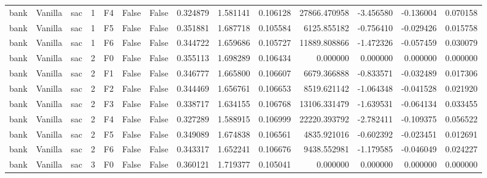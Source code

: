 \begin{tabular}{lllrlllrrrrrrr}
      bank & Vanilla &       sac &     1 &  F4 &           False &            False &  0.324879 &  1.581141 & 0.106128 &     27866.470958 &          -3.456580 &       -0.136004 &            0.070158 \\
      bank & Vanilla &       sac &     1 &  F5 &           False &            False &  0.351881 &  1.687718 & 0.105584 &      6125.855182 &          -0.756410 &       -0.029426 &            0.015758 \\
      bank & Vanilla &       sac &     1 &  F6 &           False &            False &  0.344722 &  1.659686 & 0.105727 &     11889.808866 &          -1.472326 &       -0.057459 &            0.030079 \\
      bank & Vanilla &       sac &     2 &  F0 &           False &            False &  0.355113 &  1.698289 & 0.106434 &         0.000000 &           0.000000 &        0.000000 &            0.000000 \\
      bank & Vanilla &       sac &     2 &  F1 &           False &            False &  0.346777 &  1.665800 & 0.106607 &      6679.366888 &          -0.833571 &       -0.032489 &            0.017306 \\
      bank & Vanilla &       sac &     2 &  F2 &           False &            False &  0.344469 &  1.656761 & 0.106653 &      8519.621142 &          -1.064348 &       -0.041528 &            0.021920 \\
      bank & Vanilla &       sac &     2 &  F3 &           False &            False &  0.338717 &  1.634155 & 0.106768 &     13106.331479 &          -1.639531 &       -0.064134 &            0.033455 \\
      bank & Vanilla &       sac &     2 &  F4 &           False &            False &  0.327289 &  1.588915 & 0.106999 &     22220.393792 &          -2.782411 &       -0.109375 &            0.056522 \\
      bank & Vanilla &       sac &     2 &  F5 &           False &            False &  0.349089 &  1.674838 & 0.106561 &      4835.921016 &          -0.602392 &       -0.023451 &            0.012691 \\
      bank & Vanilla &       sac &     2 &  F6 &           False &            False &  0.343317 &  1.652241 & 0.106676 &      9438.552981 &          -1.179585 &       -0.046049 &            0.024227 \\
      bank & Vanilla &       sac &     3 &  F0 &           False &            False &  0.360121 &  1.719377 & 0.105041 &         0.000000 &           0.000000 &        0.000000 &            0.000000 \\

\end{tabular}
